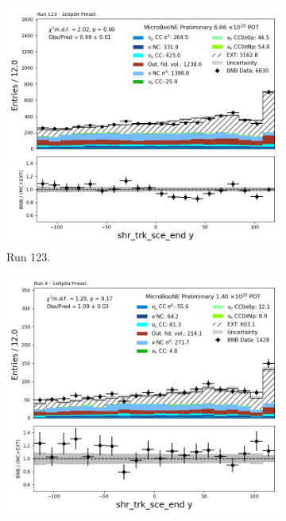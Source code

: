 \begin{figure}[H]
    \centering
    \begin{subfigure}[t]{0.32\linewidth}
        \includegraphics[width=\linewidth]{technote/Appendix_Preselection/Figures/1e0p0pi/Run123/shr_trk_sce_end_y_Run123_1e0p0pi_Presel.png}
        \caption{Run 123.}
    \end{subfigure}%
    \hspace{0.2cm}%
    \begin{subfigure}[t]{0.32\linewidth}
        \includegraphics[width=\linewidth]{technote/Appendix_Preselection/Figures/1e0p0pi/Run4b/shr_trk_sce_end_y_Run4b_1e0p0pi_Presel.png}

\end{subfigure}
\end{figure}
